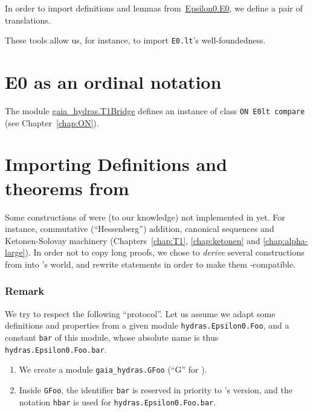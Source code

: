 


In order to import definitions and lemmas
from~\href{../theories/html/hydras.Epsilon0.E0.html}{Epsilon0.E0}, we define a pair of translations.


These tools allow us, for instance,  to import \texttt{E0.lt}'s  well-foundedness.


\section{E0 as an ordinal notation}
The module \href{../theories/html/gaia_hydras.T1Bridge.html}{gaia\_hydras.T1Bridge} defines an instance of class \texttt{ON E0lt compare}
(see Chapter~\ref{chap:ON}).







\section{Importing Definitions and theorems from \HydrasLib}

Some constructions of \HydrasLib were (to our knowledge) not implemented in \gaia yet. For instance, commutative (``Hessenberg'') addition, canonical sequences and Ketonen-Solovay machinery (Chapters~\ref{chap:T1}, \ref{chap:ketonen} and \ref{chap:alpha-large}). In order not to copy long proofs, we chose to
\emph{derive} several constructions from \HydrasLib into \gaia's world, and rewrite \HydrasLib statements in order to make them \gaia-compatible.


\subsubsection{Remark}
\label{sect:gaia-masking}
We try to respect the following ``protocol''.
Let us assume we adapt some definitions and properties
from a given module \texttt{hydras.Epsilon0.Foo}, and a constant \texttt{bar} of this module, whose absolute name is
thus \texttt{hydras.Epsilon0.Foo.bar}.
\begin{enumerate}
\item We create a module \texttt{gaia\_hydras.GFoo}
  (``G'' for \gaia).
\item Inside \texttt{GFoo}, the identifier \texttt{bar}
  is reserved in priority to \gaia's version, and the notation
  \texttt{hbar} is used for \texttt{hydras.Epsilon0.Foo.bar}.
\end{enumerate}

